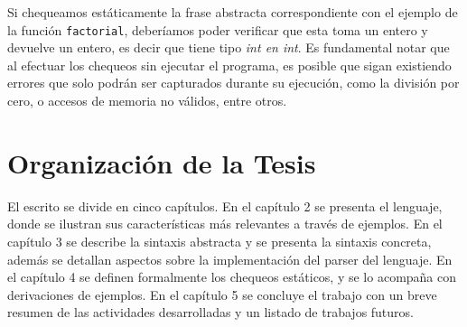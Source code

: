 Si chequeamos estáticamente la frase abstracta correspondiente con el ejemplo de la función \texttt{factorial}, deberíamos poder verificar que esta toma un entero y devuelve un entero, es decir que tiene tipo \textit{int en int}.
Es fundamental notar que al efectuar los chequeos sin ejecutar el programa, es posible que sigan existiendo errores que solo podrán ser capturados durante su ejecución, como la división por cero, o accesos de memoria no válidos, entre otros.

\section{Organización de la Tesis}

El escrito se divide en cinco capítulos.
En el capítulo 2 se presenta el lenguaje, donde se ilustran sus características más relevantes a través de ejemplos.
En el capítulo 3 se describe la sintaxis abstracta y se presenta la sintaxis concreta, además se detallan aspectos sobre la implementación del parser del lenguaje.
En el capítulo 4 se definen formalmente los chequeos estáticos, y se lo acompaña con derivaciones de ejemplos.
En el capítulo 5 se concluye el trabajo con un breve resumen de las actividades desarrolladas y un listado de trabajos futuros.
